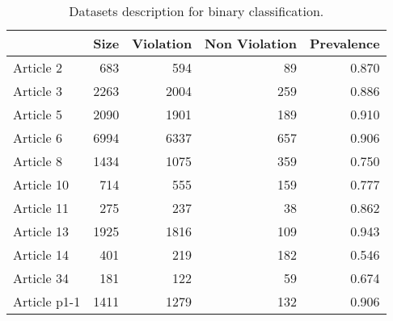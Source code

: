 \begin{table}
\centering
\caption{Datasets description for binary classification.}
\label{table:binary_datasets}
\begin{tabular}{lrrrr}
\toprule
{} &  Size &  Violation &  Non Violation &  Prevalence \\
\midrule
Article 2    &   683 &        594 &             89 &       0.870 \\
Article 3    &  2263 &       2004 &            259 &       0.886 \\
Article 5    &  2090 &       1901 &            189 &       0.910 \\
Article 6    &  6994 &       6337 &            657 &       0.906 \\
Article 8    &  1434 &       1075 &            359 &       0.750 \\
Article 10   &   714 &        555 &            159 &       0.777 \\
Article 11   &   275 &        237 &             38 &       0.862 \\
Article 13   &  1925 &       1816 &            109 &       0.943 \\
Article 14   &   401 &        219 &            182 &       0.546 \\
Article 34   &   181 &        122 &             59 &       0.674 \\
Article p1-1 &  1411 &       1279 &            132 &       0.906 \\
\bottomrule
\end{tabular}
\end{table}
